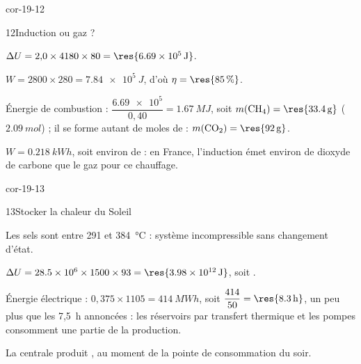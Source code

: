 \begin{blocLivre}{cor-19-12}
\begin{corrige}{12}{Induction ou gaz ?}
\begin{questions}
\item $\Delta U=2{,}0\times4180\times80=\res{\qty{6,69e5}{J}}$.
\item $W=2800\times280=\qty{7,84e5}{J}$, d'où $\eta=\res{\qty{85}{\percent}}$.
\item Énergie de combustion : $\dfrac{\num{6.69e5}}{0{,}40}=\qty{1,67}{MJ}$, soit $m(\ce{CH4})=\res{\qty{33,4}{g}}$ ($\qty{2,09}{mol}$) ; il se
forme autant de moles de  : $m(\ce{CO2})=\res{\qty{92}{g}}$.
\item $W=\qty{0,218}{kWh}$, soit environ  de  : en France, l'induction émet environ  de dioxyde de carbone que le gaz pour ce chauffage.
\end{questions}
\end{corrige}
\end{blocLivre}
\begin{blocLivre}{cor-19-13}
\begin{corrige}{13}{Stocker la chaleur du Soleil}
\begin{questions}
\item Les sels sont  entre 291 et \qty{384}{\degreeCelsius} : système incompressible sans changement d'état.
\item $\Delta U=\num{28.5e6}\times1500\times93=\res{\qty{3,98e12}{J}}$, soit .
\item Énergie électrique : $0{,}375\times1105=\qty{414}{MWh}$, soit $\dfrac{414}{50}=\res{\qty{8,3}{h}}$, un peu plus que les
7,5~h annoncées : les réservoirs  par transfert thermique et les pompes consomment une
partie de la production.
\item La centrale produit , au moment de la pointe de consommation du soir.
\end{questions}
\end{corrige}
\end{blocLivre}
